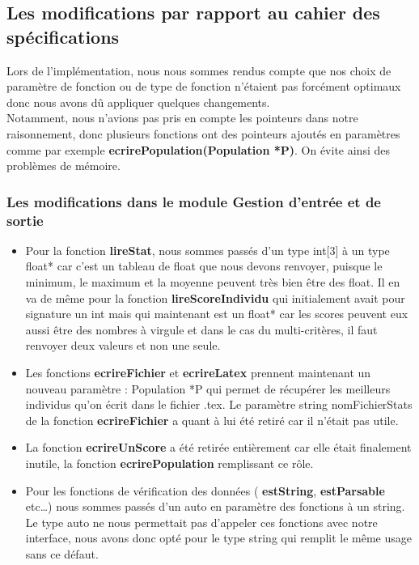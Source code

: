 \documentclass[a4paper,11pt]{article}
\begin{document}
		\subsection{Les modifications par rapport au cahier des spécifications}
			Lors de l’implémentation, nous nous sommes rendus compte que nos choix de paramètre de fonction ou de type de fonction n’étaient pas forcément optimaux donc nous avons dû appliquer quelques changements.\\
   			Notamment, nous n’avions pas pris en compte les pointeurs dans notre raisonnement, donc plusieurs fonctions ont des pointeurs ajoutés en paramètres comme par exemple \textbf{ecrirePopulation(Population *P)}. On évite ainsi des problèmes de mémoire. \\

   			\subsubsection{Les modifications dans le module Gestion d’entrée et de sortie}
   				\begin{itemize}
   					\item Pour la fonction  \textbf{lireStat}, nous sommes passés d’un type int[3] à un type float* car c’est un tableau de float que nous devons renvoyer, puisque le minimum, le maximum et la moyenne peuvent très bien être des float.
   					Il en va de même pour la fonction  \textbf{lireScoreIndividu} qui initialement avait pour signature un int mais qui maintenant est un float* car les scores peuvent eux aussi être des nombres à virgule et dans le cas du multi-critères, il faut renvoyer deux valeurs et non une seule.

   					\item Les fonctions  \textbf{ecrireFichier} et  \textbf{ecrireLatex} prennent maintenant un nouveau paramètre : Population *P qui permet de récupérer les meilleurs individus qu’on écrit dans le fichier .tex. Le paramètre string nomFichierStats de la fonction  \textbf{ecrireFichier} a quant à lui été retiré car il n'était pas utile.
   					\item La fonction  \textbf{ecrireUnScore} a été retirée entièrement car elle était finalement inutile, la fonction  \textbf{ecrirePopulation} remplissant ce rôle.

   					\item Pour les fonctions de vérification des données ( \textbf{estString},  \textbf{estParsable} etc…) nous sommes passés d’un auto en paramètre des fonctions à un string. Le type auto ne nous permettait pas d'appeler ces fonctions avec notre interface, nous avons donc opté pour le type string qui remplit le même usage sans ce défaut.
   				\end{itemize}
\end{document}
